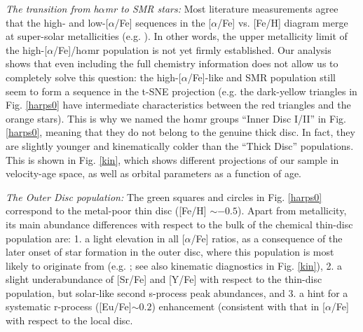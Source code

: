 \documentclass{aa}  %
\begin{document}
{\it The transition from h$\alpha$mr to SMR stars:} Most literature measurements agree that the high- and low-[$\alpha$/Fe] sequences in the [$\alpha$/Fe] vs. [Fe/H] diagram merge at super-solar metallicities (e.g. \citealt{Adibekyan2011, Anders2014, Hayden2015}). In other words, the upper metallicity limit of the high-[$\alpha$/Fe]/h$\alpha$mr population is not yet firmly established. Our analysis shows that even including the full chemistry information does not allow us to completely solve this question: the high-[$\alpha$/Fe]-like and SMR population still seem to form a sequence in the t-SNE projection (e.g. the dark-yellow triangles in Fig. \ref{harps0} have intermediate characteristics between the red triangles and the orange stars). This is why we named the h$\alpha$mr groups ``Inner Disc I/II'' in Fig. \ref{harps0}, meaning that they do not belong to the genuine thick disc. In fact, they are slightly younger and kinematically colder than the ``Thick Disc'' populations. This is shown in Fig. \ref{kin}, which shows different projections of our sample in velocity-age space, as well as orbital parameters as a function of age. %

{\it The Outer Disc population:} The green squares and circles in Fig. \ref{harps0} correspond to the metal-poor thin disc ([Fe/H] $\sim-0.5$). Apart from metallicity, its main abundance differences with respect to the bulk of the chemical thin-disc population are: 1. a light elevation in all [$\alpha$/Fe] ratios, as a consequence of the later onset of star formation in the outer disc, where this population is most likely to originate from (e.g. \citealt{Nordstroem2004, Anders2014, Hayden2015}; see also kinematic diagnostics in Fig. \ref{kin}), 2. a slight underabundance of [Sr/Fe] and [Y/Fe] with respect to the thin-disc population, but solar-like second s-process peak abundances, and 3. 
a hint for a systematic r-process ([Eu/Fe]$\sim0.2$) enhancement (consistent with that in [$\alpha$/Fe] with respect to the local disc.
\end{document}
